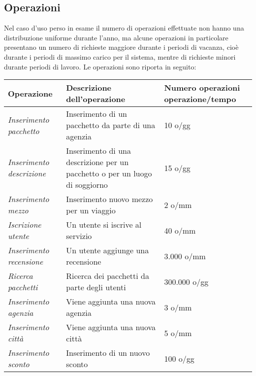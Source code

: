 \subsection{Operazioni}
Nel caso d'uso perso in esame il numero di operazioni effettuate non hanno una distribuzione uniforme durante l'anno, ma alcune operazioni in particolare presentano un numero di richieste maggiore durante i periodi di vacanza, cioè durante i periodi di massimo carico per il sistema, mentre di richieste minori durante periodi di lavoro. Le operazioni sono riporta in seguito:
\newline
\begin{tabularx}{\textwidth}{|p{} | X p{}}
    \toprule
    \textbf{Operazione} & \textbf{Descrizione dell'operazione} & \textbf{Numero operazioni operazione/tempo}
    \\\midrule
    \midrule
    \emph{Inserimento pacchetto} & Inserimento di un pacchetto da parte di una agenzia & 10 o/gg
    \\\midrule
    \emph{Inserimento descrizione} & Inserimento di una descrizione per un pacchetto o per un luogo di soggiorno & 15 o/gg
    \\\midrule
    \emph{Inserimento mezzo} & Inserimento nuovo mezzo per un viaggio & 2 o/mm
    \\\midrule
    \emph{Iscrizione utente} & Un utente si iscrive al servizio & 40 o/mm
    \\\midrule
    \emph{Inserimento recensione} & Un utente aggiunge una recensione & 3.000 o/mm
    \\\midrule
    \emph{Ricerca pacchetti} & Ricerca dei pacchetti da parte degli utenti & 300.000 o/gg
    \\\midrule
    \emph{Inserimento agenzia} & Viene aggiunta una nuova agenzia & 3 o/mm
    \\\midrule
    \emph{Inserimento città} & Viene aggiunta una nuova città & 5 o/mm
    \\\midrule
    \emph{Inserimento sconto} & Inserimento di un nuovo sconto & 100 o/gg
    \\\midrule
    \bottomrule
\end{tabularx}